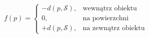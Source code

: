 \documentclass[12pt,border=10pt]{standalone}
\begin{document}
\color{ink}
\Huge
\(
\displaystyle
f(p)=
\begin{cases}
-d(p,\mathcal{S}), & \text{wewnątrz obiektu}\\
0, & \text{na powierzchni}\\
+d(p,\mathcal{S}), & \text{na zewnątrz obiektu}
\end{cases}
\)
\end{document}
